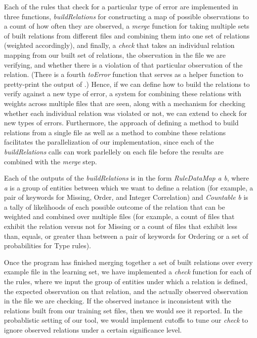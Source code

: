 Each of the rules that check for a particular type of error are implemented in three functions, \textit{buildRelations} for constructing a map of possible observations to a count of how often they are observed, a \textit{merge} function for taking multiple sets of built relations from different files and combining them into one set of relations (weighted accordingly), and finally, a \textit{check} that takes an individual relation mapping from our built set of relations, the observation in the file we are verifying, and whether there is a violation of that particular observation of the relation. (There is a fourth \textit{toError} function that serves as a helper function to pretty-print the output of \app.) Hence, if we can define how to build the relations to verify against a new type of error, a system for combining these relations with weights across multiple files that are seen, along with a mechanism for checking whether each individual relation was violated or not, we can extend \app to check for new types of errors. Furthermore, the approach of defining a method to build relations from a single file as well as a method to combine these relations facilitates the parallelization of our implementation, since each of the \textit{buildRelations} calls can work parlellely on each file before the results are combined with the \textit{merge} step.

Each of the outputs of the \textit{buildRelations} is in the form \textit{RuleDataMap a b}, where \textit{a} is a group of entities between which we want to define a relation (for example, a pair of keywords for Missing, Order, and Integer Correlation) and \textit{Countable b} is a tally of likelihoods of each possible outcome of the relation that can be weighted and combined over multiple files (for example, a count of files that exhibit the relation versus not for Missing or a count of files that exhibit less than, equals, or greater than between a pair of keywords for Ordering or a set of probabilities for Type rules).

Once the program has finished merging together a set of built relations over every example file in the learning set, we have implemented a \textit{check} function for each of the rules, where we input the group of entities under which a relation is defined, the expected observation on that relation, and the actually observed observation in the file we are checking. If the observed instance is inconsistent with the relations built from our training set files, then we would see it reported. In the probablistic setting of our tool, we would implement cutoffs to tune our \textit{check} to ignore observed relations under a certain significance level.

